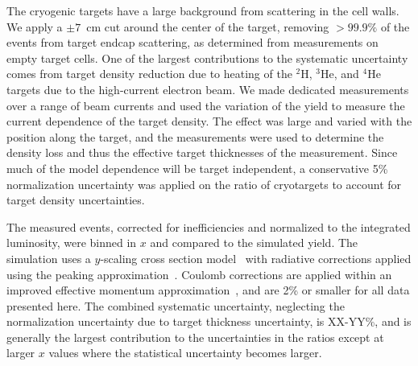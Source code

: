 
The cryogenic targets have a large background from scattering in the cell walls. We apply a $\pm 7$~cm
cut around the center of the target, removing $>99.9\%$ of the events from target endcap
scattering, as determined from measurements on empty target cells. One of the largest contributions to the
systematic uncertainty comes from target density reduction due to heating of the $^2$H, $^3$He, and $^4$He
targets due to the high-current electron beam. We made dedicated measurements over a range of
beam currents and used the variation of the yield to measure the current dependence of the target density.
The effect was large and varied with the position along the target, and the measurements were used to
determine the density loss and thus the effective target thicknesses of the measurement. Since much 
of the model dependence will be target independent, a conservative 5\% normalization uncertainty was applied
on the ratio of cryotargets to account for target density uncertainties.


The measured events, corrected for inefficiencies and normalized to the integrated luminosity, were binned
in $x$ and compared to the simulated yield. The simulation uses a $y$-scaling cross section
model~\cite{day_arns, arrington99} with radiative corrections applied using the peaking
approximation~\cite{zye_thesis, stein75}. Coulomb corrections are applied within an improved effective
momentum approximation~\cite{aste05}, and are 2\% or smaller for all data presented here.  The combined 
systematic uncertainty, neglecting the normalization uncertainty due to target thickness uncertainty,
is XX-YY\%, and is generally the largest contribution to the uncertainties in the ratios except at larger
$x$ values where the statistical uncertainty becomes larger.



